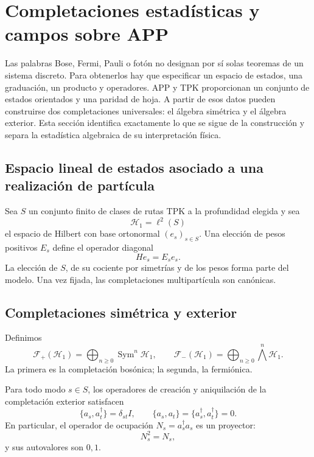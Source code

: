 \chapter{Completaciones estadísticas y campos sobre APP}
\label{chap:completaciones-cuanticas}

Las palabras Bose, Fermi, Pauli o fotón no designan por sí solas teoremas de
un sistema discreto. Para obtenerlos hay que especificar un espacio de estados,
una graduación, un producto y operadores. APP y TPK proporcionan un conjunto
de estados orientados y una paridad de hoja. A partir de esos datos pueden
construirse dos completaciones universales: el álgebra simétrica y el álgebra
exterior. Esta sección identifica exactamente lo que se sigue de la
construcción y separa la estadística algebraica de su interpretación física.

\section{Espacio lineal de estados asociado a una realización de partícula}

Sea \(S\) un conjunto finito de clases de rutas TPK a la profundidad elegida
y sea
\[
 \mathcal H_1=\ell^2(S)
\]
el espacio de Hilbert con base ortonormal \((e_s)_{s\in S}\). Una elección de
pesos positivos \(E_s\) define el operador diagonal
\[
 He_s=E_se_s.
\]
La elección de \(S\), de su cociente por simetrías y de los pesos forma parte
del modelo. Una vez fijada, las completaciones multipartícula son canónicas.

\section{Completaciones simétrica y exterior}

Definimos
\[
 \mathcal F_+(\mathcal H_1)=
 \bigoplus_{n\geq0}\operatorname{Sym}^n\mathcal H_1,
 \qquad
 \mathcal F_-(\mathcal H_1)=
 \bigoplus_{n\geq0}\bigwedge^n\mathcal H_1.
\]
La primera es la completación bosónica; la segunda, la fermiónica.

\begin{theorem}
Para todo modo \(s\in S\), los operadores de creación y aniquilación de la
completación exterior satisfacen
\[
 \{a_s,a_t^\dagger\}=\delta_{st}I,
 \qquad
 \{a_s,a_t\}=\{a_s^\dagger,a_t^\dagger\}=0.
\]
En particular, el operador de ocupación
\(N_s=a_s^\dagger a_s\) es un proyector:
\[
 N_s^2=N_s,
\]
y sus autovalores son \(0,1\).
\end{theorem}

